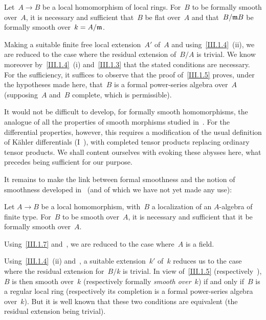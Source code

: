 \begin{corollary}
\label{III.1.7}
Let~$A\to B$ be a local homomorphism of local rings. For~$B$ to be formally smooth over~$A$, it is necessary and sufficient that~$B$ be flat over~$A$ and that~$B/\mathfrak{m}B$ be formally smooth over~$k=A/\mathfrak{m}$.
\end{corollary}
Making a suitable finite free local extension~$A'$ of~$A$ and using~\ref{III.1.4}~(ii), we are reduced to the case where the residual extension of~$B/A$ is trivial. We know moreover by~\ref{III.1.4}~(i) and~\ref{III.1.3} that the stated conditions are necessary. For the sufficiency, it suffices to observe that the proof of~\ref{III.1.5} proves, under the hypotheses made here, that~$B$ is a formal power-series algebra over~$A$ (supposing~$A$ and~$B$ complete, which is permissible).

\begin{remark}
\label{III.1.8}
It would not be difficult to develop, for formally smooth homomorphisms, the analogue of all the properties of smooth morphisms studied in~. For the differential properties, however, this requires a modification of the usual definition of Kähler differentials (\cf I~), with completed tensor products replacing ordinary tensor products. We shall content ourselves with evoking these abysses here, what precedes being sufficient for our purpose.

It remains to make the link between formal smoothness and the notion of smoothness developed in~ (and of which we have not yet made any use):
\end{remark}

\begin{proposition}
\label{III.1.9}
Let $A\to B$ be a local homomorphism, with~$B$ a localization of an $A$-algebra of finite type. For~$B$ to be smooth over~$A$, it is necessary and sufficient that it be formally smooth over~$A$.
\end{proposition}

Using~\ref{III.1.7} and~, we are reduced to the case where~$A$ is a field.

Using~\ref{III.1.4}~(ii) and~, a suitable extension~$k'$ of~$k$ reduces us to the case where the residual extension for~$B/k$ is trivial. In view of~\ref{III.1.5} (respectively~), $B$ is then smooth over~$k$ (respectively formally \emph{smooth over}~$k$) if and only if~$B$ is a regular local ring (respectively its completion is a formal power-series algebra over~$k$). But it is well known that these two conditions are equivalent (the residual extension being trivial).
